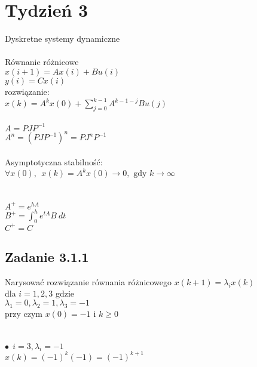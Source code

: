 \pagebreak
\section*{Tydzień 3}
Dyskretne systemy dynamiczne\\
\\
Równanie różnicowe\\
$x(i+1)=Ax(i)+Bu(i)$\\
$y(i)=Cx(i)$\\
rozwiązanie:\\
$x(k)=A^kx(0)+\sum^{k-1}_{j=0}A^{k-1-j}Bu(j)$\\
\\
$A=PJP^{-1}$\\
$A^n=(PJP^{-1})^n=PJ^nP^{-1}$\\
\\
Asymptotyczna stabilność:\\
$\forall x(0), \ \ x(k)=A^kx(0)\rightarrow0, \text{ gdy } k\rightarrow \infty$\\
\\
\\
$A^+=e^{hA}$\\
$B^+=\int^h_0e^{tA}B \ dt$\\
$C^+=C$\\


\pagebreak
\subsection*{Zadanie 3.1.1} {\color{darkgray}
	Narysować rozwiązanie równania różnicowego $x(k+1)=\lambda_ix(k)$\\
	 dla $i=1,2,3$ gdzie \\
	$\lambda_1 = 0, \lambda_2=1, \lambda_3=-1$ \\
	przy czym $x(0)=-1$ i $k\geq0$\\
}\lineh
\\\\
\noindent$\bullet\ \ i=3, \lambda_i = -1$\\
$x(k)=(-1)^k(-1)=(-1)^{k+1}$


